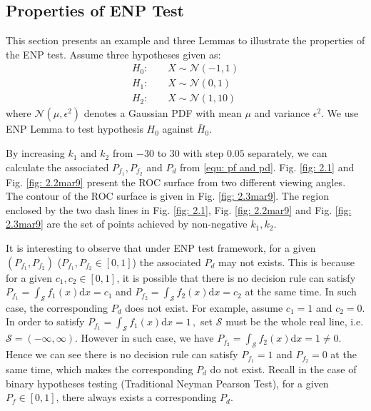 
\subsection{Properties of ENP Test}
This section presents an example and three Lemmas to illustrate the properties of the ENP test. 
Assume three hypotheses given as:
\begin{equation}
  \label{2015jan29a2}
\begin{split}
H_0:\;\;\;\;&X \sim \mathcal{N}(-1, 1)\\
H_1:\;\;\;\;&X \sim \mathcal{N}(0, 1)\\
H_2:\;\;\;\;&X \sim \mathcal{N}(1, 10)
\end{split}
\end{equation}
where $\mathcal{N}(\mu, \epsilon^2)$ denotes a Gaussian PDF with mean $\mu$ and variance $\epsilon^2$. 
We use ENP Lemma to test hypothesis $H_0$ against $\bar{H}_0$. 

By increasing $k_1$ and $k_2$ from $-30$ to $30$ with step $0.05$ separately, we can calculate the associated $P_{f_1}, P_{f_2}$ and $P_d$ from \eqref{equ: pf and pd}. 
Fig. \ref{fig: 2.1} and Fig. \ref{fig: 2.2mar9} present the ROC surface from two different viewing angles. The contour of the ROC surface is given in Fig. \ref{fig: 2.3mar9}. The region enclosed by the two dash lines in Fig. \ref{fig: 2.1}, Fig. \ref{fig: 2.2mar9} and Fig. \ref{fig: 2.3mar9} are the set of points achieved by non-negative $k_1, k_2$.  

It is interesting to observe that under ENP test framework, for a given $(P_{f_1}, P_{f_2})$  ($P_{f_1}, P_{f_2}\in [0, 1]$) the associated $P_d$ may not exists. This is because for a given $c_1, c_2 \in [0, 1]$, it is possible that there is no decision rule can satisfy
$
  P_{f_1} = \int_{\mathcal{S}}f_1(x)\mathrm{d}x =  c_1
$
and
$
  P_{f_2} = \int_{\mathcal{S}}f_2(x)\mathrm{d}x = c_2
$
at the same time. In such case, the corresponding $P_d$ does not exist. 
For example, assume $c_1 = 1$ and $c_2 = 0$. In order to satisfy 
$
  P_{f_1} = \int_{\mathcal{S}}f_1(x)\mathrm{d}x = 1\,,
$
set $\mathcal{S}$  must  be the whole real line, i.e. $\mathcal{S} = (-\infty, \infty)$. However in such case, we have
$
  P_{f_2} = \int_{\mathcal{S}}f_2(x)\mathrm{d}x = 1 \neq 0
$.
Hence we can see there is no decision rule can satisfy $P_{f_1} = 1$ and $P_{f_2} = 0$ at the same time, which makes the corresponding $P_d$ do not exist.
Recall in the case of binary hypotheses testing (Traditional Neyman Pearson Test), for a given $P_f \in [0, 1]$, there always exists a corresponding $P_d$. 

